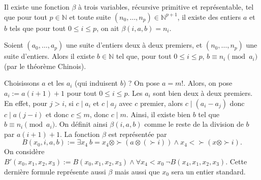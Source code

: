 \documentclass[./main]{subfiles}
\begin{document}
 \begin{lem}
   Il existe une fonction $\beta$ à trois variables, récursive primitive et représentable, tel que pour tout  $p \in \mathds{N}$ et toute suite $(n_0, \ldots, n_p) \in \mathds{N}^{p+1}$, il existe des entiers $a$ et $b$ tels que pour tout $0 \le i \le p$, on ait $\beta(i, a, b) = n_i$.
 \end{lem}
 \begin{prv}
   Soient $(a_0, \ldots, a_p)$ une suite d'entiers deux à deux premiers, et $(n_0, \ldots, n_p)$ une suite d'entiers.
   Alors il existe $b \in \mathds{N}$ tel que, pour tout $0 \le i \le p$, $b \equiv n_i \pmod{a_i}$ (par le théorème Chinois).

   Choisissons $a$ et les $a_i$ (qui induisent $b$) ?
   On pose $a = m!$.
   Alors, on pose $a_i := a (i+1) + 1$ pour tout $0 \le i \le p$.
   Les $a_i$ sont bien deux à deux premiers.
   En effet, pour $j > i$, si  $c  \mid a_i$ et $c  \mid a_j$ avec $c$ premier, alors $c  \mid (a_i - a_j)$ donc $c  \mid a (j-i)$ et donc $c \le m$, donc $c  \mid m$.
   Ainsi, il existe bien $b$ tel que $b \equiv n_i \pmod {a_i}$.
   On définit ainsi  $\beta(i, a, b)$ comme le reste de la division de  $b$ par $a(i+1) + 1$.
   La fonction $\beta$ est représentée par  \[
   B(x_0, i, a, b) := \exists x_4 \: b = x_4 \otimes \succ (a \otimes (\succ i)) \land x_4 < \succ(x \otimes \succ i)
   .\]
   On considère $B'(x_0, x_1, x_2, x_3) := B(x_0, x_1, x_2, x_3) \land \forall x_4 < x_0 \:\lnot B(x_4, x_1, x_2, x_3)$.
   Cette dernière formule représente aussi $\beta$ mais aussi que $x_0$ sera un entier standard.
 \end{prv}
\end{document}
